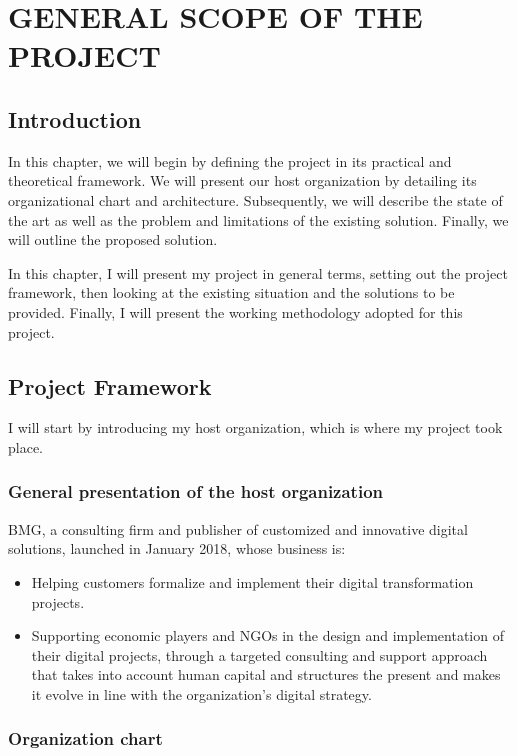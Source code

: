 \chapter{GENERAL SCOPE OF THE PROJECT}

\section*{Introduction}
In this chapter, we will begin by defining the project in its practical and theoretical framework. We will present our host organization by detailing its organizational chart and architecture. Subsequently, we will describe the state of the art as well as the problem and limitations of the existing solution. Finally, we will outline the proposed solution.


In this chapter, I will present my project in general terms, setting out the project framework, then looking at the existing situation and the solutions to be provided. Finally, I will present the working methodology adopted for this project.

\section{Project Framework}

I will start by introducing my host organization, which is where my project took place.

\subsection{General presentation of the host organization}

BMG, a consulting firm and publisher of customized and innovative digital solutions, launched in January 2018, whose business is:
\begin{itemize}
    \item Helping customers formalize and implement their digital transformation projects.
    \item Supporting economic players and NGOs in the design and implementation of their digital projects, through a targeted consulting and support approach that takes into account human capital and structures the present and makes it evolve in line with the organization's digital strategy.
\end{itemize}

\subsection{Organization chart}

